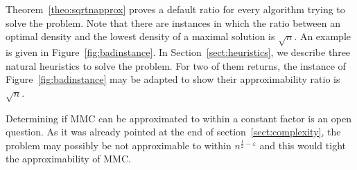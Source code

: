 Theorem~\ref{theo:sqrtnapprox} proves a default ratio for every algorithm trying to solve the problem. Note that there are instances in which the ratio between an optimal density and the lowest density of a maximal solution is $\sqrt{n}$. An example is given in Figure~\ref{fig:badinstance}. In Section~\ref{sect:heuristics}, we describe three natural heuristics to solve the problem. For two of them returns, the instance of Figure~\ref{fig:badinstance} may be adapted to show their approximability ratio is $\sqrt{n}$. 





Determining if MMC can be approximated to within a constant factor is an open question. As it was already pointed at the end of section~\ref{sect:complexity}, the problem may possibly be not approximable to within $n^{\frac{1}{2}-\varepsilon}$ and this would tight the approximability of MMC.


